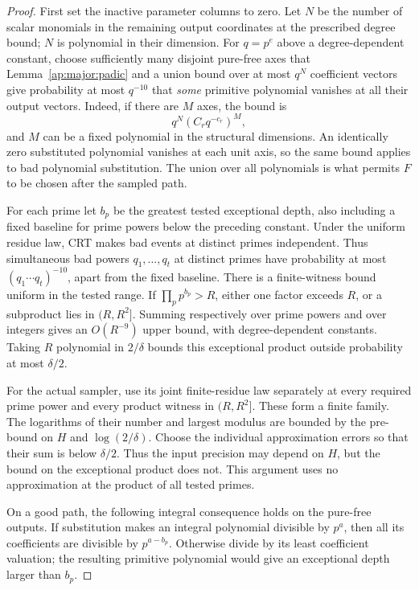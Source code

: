 \begin{proof}
First set the inactive parameter columns to zero.  Let $N$ be the
number of scalar monomials in the remaining output coordinates at
the prescribed degree bound; $N$ is polynomial in their dimension.
For $q=p^e$ above a degree-dependent constant, choose sufficiently
many disjoint pure-free axes that Lemma~\ref{ap:major:padic} and a
union bound over at most $q^N$ coefficient vectors give probability
at most $q^{-10}$ that \emph{some} primitive polynomial vanishes at
all their output vectors.  Indeed, if there are $M$ axes, the bound
is
\[
                  q^N(C_rq^{-c_r})^M,
\]
and $M$ can be a fixed polynomial in the structural dimensions.
An identically zero substituted polynomial vanishes at each unit
axis, so the same bound applies to bad polynomial substitution.
The union over all polynomials is what permits $F$ to be chosen
after the sampled path.

For each prime let $b_p$ be the greatest tested exceptional depth,
also including a fixed baseline for prime powers below the preceding
constant.  Under the uniform residue law, CRT makes bad events at
distinct primes independent.  Thus simultaneous bad powers
$q_1,\ldots,q_t$ at distinct primes have probability at most
$(q_1\cdots q_t)^{-10}$, apart from the fixed baseline.
There is a finite-witness bound uniform in the tested range.  If
$\prod_p p^{b_p}>R$, either one factor exceeds $R$, or a subproduct
lies in $(R,R^2]$.  Summing respectively over prime powers and over
integers gives an $O(R^{-9})$ upper bound, with degree-dependent
constants.  Taking $R$ polynomial in $2/\delta$ bounds this
exceptional product outside probability at most $\delta/2$.

For the actual sampler, use its joint finite-residue law separately
at every required prime power and every product witness in
$(R,R^2]$.  These form a finite family.  The logarithms of their
number and largest modulus are bounded by the pre-bound on $H$ and
$\log(2/\delta)$.  Choose the individual approximation errors so
that their sum is below $\delta/2$.  Thus the input precision may
depend on $H$, but the bound on the exceptional product does not.
This argument uses no approximation at the product of all tested
primes.

On a good path, the following integral consequence holds on the
pure-free outputs.  If substitution makes an integral polynomial
divisible by $p^a$, then all its coefficients are divisible by
$p^{a-b_p}$.  Otherwise divide by its least coefficient valuation;
the resulting primitive polynomial would give an exceptional depth
larger than $b_p$.


\end{proof}
